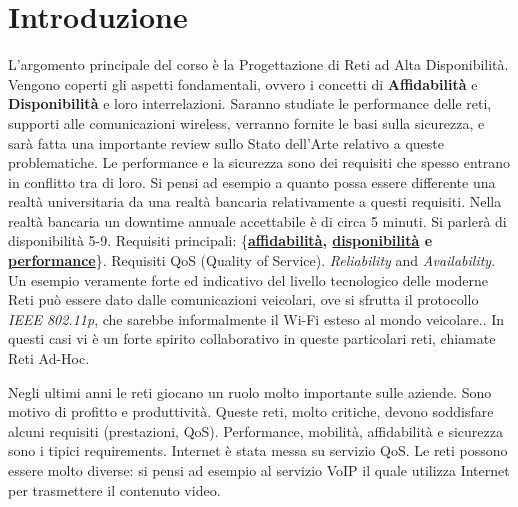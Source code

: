
\chapter{Introduzione}
\label{cap:intro}

L'argomento principale del corso è la Progettazione di Reti ad Alta Disponibilità. Vengono coperti gli aspetti fondamentali, ovvero i concetti di \textbf{Affidabilità} e \textbf{Disponibilità} e loro interrelazioni. Saranno studiate le performance delle reti, supporti alle comunicazioni wireless, verranno fornite le basi sulla sicurezza, e sarà fatta una importante review sullo Stato dell'Arte relativo a queste problematiche. Le performance e la sicurezza sono dei requisiti che spesso entrano in conflitto tra di loro. Si pensi ad esempio a quanto possa essere differente una realtà universitaria da una realtà bancaria relativamente a questi requisiti. Nella realtà bancaria un downtime annuale accettabile è di circa 5 minuti. Si parlerà di disponibilità 5-9. Requisiti principali: \{\textbf{\underline{affidabilità}, \underline{disponibilità} e \underline{performance}}\}. Requisiti QoS (Quality of Service). \textit{Reliability} and \textit{Availability}.
Un esempio veramente forte ed indicativo del livello tecnologico delle moderne Reti può essere dato dalle comunicazioni veicolari, ove si sfrutta il protocollo \textit{IEEE 802.11p}, che sarebbe informalmente il Wi-Fi esteso al mondo veicolare.. In questi casi vi è un forte spirito collaborativo in queste particolari reti, chiamate Reti Ad-Hoc.

Negli ultimi anni le reti giocano un ruolo molto importante sulle aziende. Sono motivo di profitto e produttività. Queste reti, molto critiche, devono soddisfare alcuni requisiti (prestazioni, QoS). Performance, mobilità, affidabilità e sicurezza sono i tipici requirements. Internet è stata messa su servizio QoS. Le reti possono essere molto diverse: si pensi ad esempio al servizio VoIP il quale utilizza Internet per trasmettere il contenuto video.

